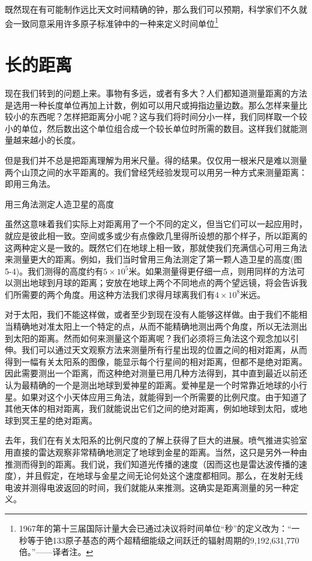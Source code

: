 \documentclass[12pt,oneside]{book}
\begin{document}
\begin{common-format}
既然现在有可能制作远比天文时间精确的钟，那么我们可以预期，科学家们不久就会一致同意采用许多原子标准钟中的一种来定义时间单位\footnote{1967年的第十三届国际计量大会已通过决议将时间单位“秒”的定义改为：“一秒等于铯133原子基态的两个超精细能级之间跃迁的辐射周期的9,192,631,770倍。”——译者注。}



\section{长的距离}
现在我们转到的问题上来。事物有多远，或者有多大？人们都知道测量距离的方法是选用一种长度单位再加上计数，例如可以用尺或拇指边量边数。那么怎样来量比较小的东西呢？怎样把距离分小呢？这与我们将时间分小一样，我们同样取一个较小的单位，然后数出这个单位组合成一个较长单位时所需的数目。这样我们就能测量越来越小的长度。

但是我们并不总是把距离理解为用米尺量。得的结果。仅仅用一根米尺是难以测量两个山顶之间的水平距离的。我们曾经凭经验发现可以用另一种方式来测量距离：即用三角法。
\begin{fig}{用三角法测定人造卫星的高度}
\caption{用三角法测定人造卫星的高度}
\label{fig:用三角法测定人造卫星的高度}
\end{fig}
虽然这意味着我们实际上对距离用了一个不同的定义，但当它们可以一起应用时，就应是彼此相一致。空间或多或少有点像欧几里得所设想的那个样子，所以距离的这两种定义是一致的。既然它们在地球上相一致，那就使我们充满信心可用三角法来测量更大的距离。例如，我们当时曾用三角法测定了第一颗人造卫星的高度(图5-4)。我们测得的高度约有$ 5\times 10^5$米。如果测量得更仔细一点，则用同样的方法可以测出地球到月球的距离；安放在地球上两个不同地点的两个望远镜，将会告诉我们所需要的两个角度。用这种方法我们求得月球离我们有$ 4 \times 10^8 $米远。

对于太阳，我们不能这样做，或者至少到现在没有人能够这样做。由于我们不能相当精确地对准太阳上一个特定的点，从而不能精确地测出两个角度，所以无法测出到太阳的距离。然而如何来测量这个距离呢？我们必须将三角法这个观念加以引伸。我们可以通过天文观察方法来测量所有行星出现的位置之间的相对距离，从而得到一幅有关太阳系的图像，能显示每个行星间的相对距离，但都不是绝对距离。因此需要测出一个距离，而这种绝对测量已用几种方法得到，其中直到最近以前还认为最精确的一个是测出地球到爱神星的距离。爱神星是一个时常靠近地球的小行星。如果对这个小天体应用三角法，就能得到一个所需要的比例尺度。由于知道了其他天体的相对距离，我们就能说出它们之间的绝对距离，例如地球到太阳，或地球到冥王星的绝对距离。

去年，我们在有关太阳系的比例尺度的了解上获得了巨大的进展。喷气推进实验室用直接的雷达观察非常精确地测定了地球到金星的距离。当然，这只是另外一种由推测而得到的距离。我们说，我们知道光传播的速度（因而这也是雷达波传播的速度），并且假定，在地球与金星之间无论何处这个速度都相同。那么，在发射无线电波并测得电波返回的时间，我们就能从来推测。这确实是距离测量的另一种定义。


\end{common-format}
\end{document}
